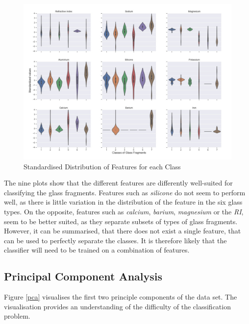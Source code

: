 \begin{figure}[ht]
\centering
\includegraphics[scale=0.3]{figures/fdist_violin.jpg}
\captionsetup{justification=centering,margin=2cm}
\caption{Standardised Distribution of Features for each Class}
\label{feature_distribution_classes}
\end{figure}

The nine plots show that the different features are differently well-suited for classifying the glass fragments. Features such as \textit{silicone} do not seem to perform well, as there is little variation in the distribution of the feature in the six glass types. On the opposite, features such as \textit{calcium}, \textit{barium}, \textit{magnesium} or the \textit{RI}, seem to be better suited, as they separate subsets of types of glass fragments. However, it can be summarised, that there does not exist a single feature, that can be used to perfectly separate the classes. It is therefore likely that the classifier will need to be trained on a combination of features.


\subsection{Principal Component Analysis}
Figure \ref{pca} visualises the first two principle components of the data set. The visualisation provides an understanding of the difficulty of the classification problem.

